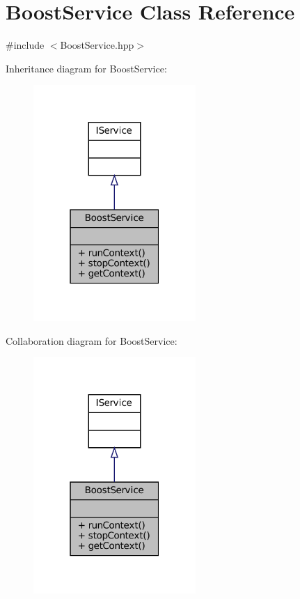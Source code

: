 \hypertarget{classBoostService}{}\section{Boost\+Service Class Reference}
\label{classBoostService}


{\ttfamily \#include $<$Boost\+Service.\+hpp$>$}



Inheritance diagram for Boost\+Service\+:
\nopagebreak
\begin{figure}[H]
\begin{center}
\leavevmode
\includegraphics[width=175pt]{classBoostService__inherit__graph}
\end{center}
\end{figure}


Collaboration diagram for Boost\+Service\+:
\nopagebreak
\begin{figure}[H]
\begin{center}
\leavevmode
\includegraphics[width=175pt]{classBoostService__coll__graph}
\end{center}
\end{figure}
